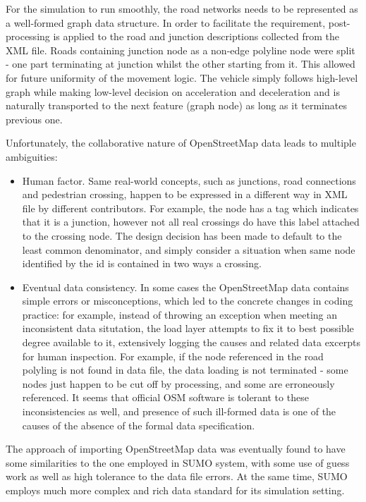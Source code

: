 For the simulation to run smoothly, the road networks needs to be represented as a well-formed graph data structure. In order to facilitate the requirement, post-processing is applied to the road and junction descriptions collected from the XML file. Roads containing junction node as a non-edge polyline node were split - one part terminating at junction whilst the other starting from it. This allowed for future uniformity of the movement logic. The vehicle simply follows high-level graph while making low-level decision on acceleration and deceleration and is naturally transported to the next feature (graph node) as long as it terminates previous one.

Unfortunately, the collaborative nature of OpenStreetMap data leads to multiple ambiguities:
\begin{itemize}
    \item Human factor. Same real-world concepts, such as junctions, road connections and pedestrian crossing, happen to be expressed in a different way in XML file by different contributors. For example, the node has a tag which indicates that it is a junction, however not all real crossings do have this label attached to the crossing node. The design decision has been made to default to the least common denominator, and simply consider a situation when same node identified by the id is contained in two ways a crossing.
    \item Eventual data consistency. In some cases the OpenStreetMap data contains simple errors or misconceptions, which led to the concrete changes in coding practice: for example, instead of throwing an exception when meeting an inconsistent data situtation, the load layer attempts to fix it to best possible degree available to it, extensively logging the causes and related data excerpts for human inspection. For example, if the node referenced in the road polyling is not found in data file, the data loading is not terminated - some nodes just happen to be cut off by processing, and some are erroneously referenced. It seems that official OSM software is tolerant to these inconsistencies as well, and presence of such ill-formed data is one of the causes of the absence of the formal data specification.
\end{itemize}

The approach of importing OpenStreetMap data was eventually found to have some similarities to the one employed in SUMO system, with some use of guess work as well as high tolerance to the data file errors. At the same time, SUMO employs much more complex and rich data standard for its simulation setting.

